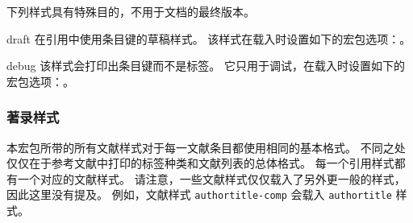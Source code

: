 下列样式具有特殊目的，不用于文档的最终版本。

\begin{marglist}

\item[draft]
在引用中使用条目键的草稿样式。
该样式在载入时设置如下的宏包选项：。

\item[debug]
该样式会打印出条目键而不是标签。
它只用于调试，在载入时设置如下的宏包选项：。

\end{marglist}

\subsubsection{著录样式}%
\label{use:xbx:bbx}


本宏包所带的所有文献样式对于每一文献条目都使用相同的基本格式。
不同之处仅仅在于参考文献中打印的标签种类和文献列表的总体格式。
每一个引用样式都有一个对应的文献样式。
请注意，一些文献样式仅仅载入了另外更一般的样式，因此这里没有提及。
例如，文献样式 \texttt{authortitle-comp} 会载入 \texttt{authortitle} 样式。

